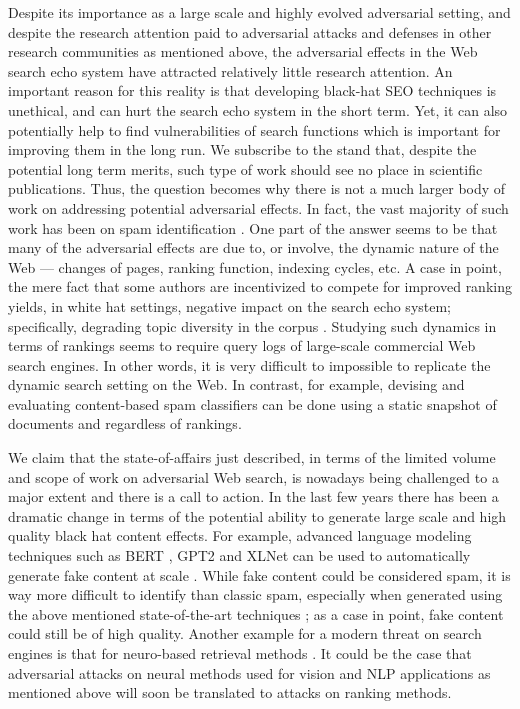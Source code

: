 Despite its importance as a large scale and highly evolved adversarial
setting, and despite the research attention paid to adversarial
attacks and defenses in other research communities as mentioned above,
the adversarial effects in the Web search echo system have attracted
relatively little research attention.
An important reason for this reality is that developing black-hat SEO
techniques is unethical, and can hurt the search echo system in the
short term. Yet, it can also potentially help to find vulnerabilities
of search functions which is important for improving them in the long
run. We subscribe to the stand that, despite the potential long term
merits, such type of work should see no place in
scientific publications. Thus, the question becomes why there is not a
much larger body of work on addressing
potential adversarial effects. In fact, the vast majority of such work
has been on spam identification
\cite{AIRWeb,Castillo+Davison:10a}. One part of the answer seems to be
that many of the adversarial effects are due to, or involve, the dynamic nature of the Web --- changes of pages,
ranking function, indexing cycles, etc. A case in point, the mere fact that some authors
are incentivized to compete for improved ranking yields, in 
white hat settings, negative
impact on the search echo system; specifically, degrading topic
diversity in the corpus \cite{Basat+al:17a,Raifer+al:17a}.
Studying such dynamics in terms of rankings seems to require query
logs of large-scale commercial Web search engines. In other words, it
is very difficult to impossible to replicate the dynamic search
setting on the Web. In contrast, for example, devising and evaluating content-based
spam classifiers can be done using a static snapshot of documents and
regardless of rankings.

We claim that the state-of-affairs just described, in terms of the
limited volume and scope of work on adversarial Web search, is
nowadays being challenged to a major extent and there is a call to
action. In the last few years there has been a dramatic change in
terms of the potential ability to generate large scale and high
quality black hat content effects. For example, advanced language modeling
techniques such as BERT \cite{Delvin+al:18a}, GPT2
\cite{Radford+al:18a} and XLNet \cite{Yang+al:19a} can be used to
automatically generate fake content at scale
\cite{Zellers+al:19a}. While fake content could be considered spam, it
is way more difficult to identify than classic spam, especially when
generated using the above mentioned state-of-the-art techniques
\cite{Zellers+al:19a}; as a case in point, fake content could still be of high
quality.  Another example for a
modern threat on search engines is that for neuro-based retrieval
methods \cite{Mitra+al:18a}. It could be the case that adversarial
attacks on neural methods used for vision and NLP applications as
mentioned above will soon be translated to attacks on ranking methods.

